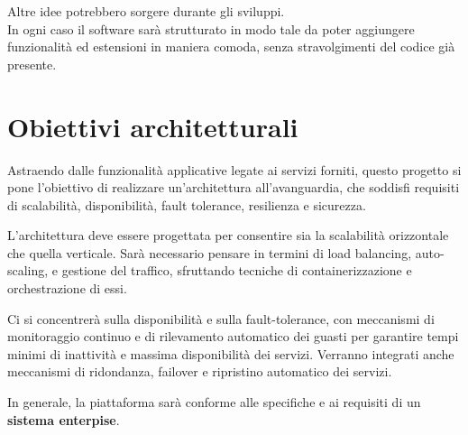 \noindent Altre idee potrebbero sorgere durante gli sviluppi.\\
In ogni caso il software sarà strutturato in modo tale da poter aggiungere funzionalità ed estensioni in maniera comoda, senza stravolgimenti del codice già presente.

\newpage
\section{Obiettivi architetturali}
Astraendo dalle funzionalità applicative legate ai servizi forniti, questo progetto si pone l'obiettivo di realizzare un'architettura all'avanguardia, che soddisfi requisiti di scalabilità, disponibilità, fault tolerance, resilienza e sicurezza. \newline


L'architettura deve essere progettata per consentire sia la scalabilità orizzontale che quella verticale. Sarà necessario pensare in termini di load balancing, auto-scaling, e gestione del traffico, sfruttando tecniche di containerizzazione e orchestrazione di essi.

Ci si concentrerà sulla disponibilità e sulla fault-tolerance, con meccanismi di monitoraggio continuo e di rilevamento automatico dei guasti per garantire tempi minimi di inattività e massima disponibilità dei servizi. Verranno integrati anche meccanismi di ridondanza, failover e ripristino automatico dei servizi.\newline

\noindent In generale, la piattaforma sarà conforme alle specifiche e ai requisiti di un \textbf{sistema enterpise}.
